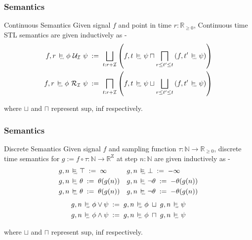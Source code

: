 \documentclass{beamer}
\newcommand{\typeTime}{\mathbb{R}_{\geq 0}}
\newcommand{\typeReal}{\mathbb{R}}
\newcommand{\typeNat}{\mathbb{N}}
\newcommand{\until}{\mathcal{U}}
\newcommand{\release}{\mathcal{R}}
\newcommand{\interval}{\mathcal{I}}
\newcommand{\Z}{\text{Z}}
\newcommand{\discrete}{\raisebox{-0.1ex}{\scalebox{0.25}{\textrm{DSC}}}}
\newcommand{\cont}{\raisebox{-0.1ex}{\scalebox{0.25}{\textrm{CNT}}}}
\newcommand{\discreteSatisfy}{\ \stackMath\stackunder[0pt]{\vDash}{\hspace*{0.3em}\discrete}\ }
\newcommand{\contSatisfy}{\ \stackMath\stackunder[0pt]{\vDash}{\hspace*{0.3em}\cont}\ }
\newcommand{\robustAssign}{\; := \;}
\begin{document}
\begin{frame}
    \frametitle{Semantics}
    \begin{block}{Continuous Semantics}
        Given signal $f$ and point in time $r : \typeTime$,
        Continuous time STL semantics are given inductively as -
        \begin{align*}
            f, r \contSatisfy \phi\ \until_{\interval}\ \psi
           \robustAssign \bigsqcup_{t: r+\interval}\left( f, t \contSatisfy \psi
           \sqcap \bigsqcap_{r \leq t' \leq t} \left( f, t' \contSatisfy \psi
            \right ) \right) \\
            f, r \contSatisfy \phi\ \release_{\interval}\ \psi
           \robustAssign \bigsqcap_{t: r+\interval}\left( f, t \contSatisfy \psi
           \sqcup \bigsqcup_{r \leq t' \leq t} \left( f, t' \contSatisfy \psi
            \right ) \right)
        \end{align*}
    \end{block}
    where $\sqcup$ and $\sqcap$ represent $\text{sup}$, $\text{inf}$ respectively.
\end{frame}

\begin{frame}
    \frametitle{Semantics}
    \begin{block}{Discrete Semantics}
        Given signal $f$ and sampling function $\tau : \typeNat
        \to \typeTime$, discrete time semantics for $g := f \circ \tau : \typeNat
        \to  \typeReal^{\Z}$ at step $n:\typeNat$ are given inductively as -
        \begin{align*}
              g, n &\discreteSatisfy \top       \robustAssign \infty &
              g, n &\discreteSatisfy \bot       \robustAssign -\infty \\
              g, n &\discreteSatisfy \theta     \robustAssign \theta(g(n)) &
              g, n &\discreteSatisfy \neg\theta \robustAssign -\theta(g(n)) \\
              g, n &\discreteSatisfy \theta     \robustAssign \theta(g(n)) &
              g, n &\discreteSatisfy \neg\theta \robustAssign -\theta(g(n)) \\
        \end{align*}
        \vspace{-1.6cm}
        \begin{align*}
            g, n \discreteSatisfy \phi \vee \psi  \robustAssign  g, n \discreteSatisfy \phi \; \sqcup \; g, n\discreteSatisfy \psi \\
            g, n \discreteSatisfy \phi \wedge \psi  \robustAssign  g, n \discreteSatisfy \phi \; \sqcap \; g, n \discreteSatisfy \psi \\
        \end{align*}
    \end{block}
    where $\sqcup$ and $\sqcap$ represent $\text{sup}$, $\text{inf}$ respectively.
\end{frame}
\end{document}
